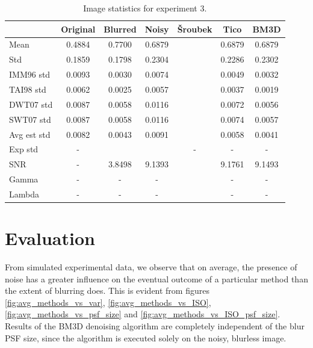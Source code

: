 \documentclass[12pt,notitlepage]{report}
\begin{document}
\begin{table}[htb]
	\centering
	\begin{tabular}{ | l | c | c | c | c | c | c | }
	\hline
		& Original & Blurred & Noisy & Šroubek & Tico & BM3D \\ \hline 
	Mean & 0.4884 & 0.7700 & 0.6879 &  & 0.6879 & 0.6879 \\ \hline 
	Std & 0.1859 & 0.1798 & 0.2304 &  & 0.2286 & 0.2302 \\ \hline 
	IMM96 std & 0.0093 & 0.0030 & 0.0074 &  & 0.0049 & 0.0032 \\ \hline 
	TAI98 std  & 0.0062 & 0.0025 & 0.0057 &  & 0.0037 & 0.0019 \\ \hline 
	DWT07 std  & 0.0087 & 0.0058 & 0.0116 &  & 0.0072 & 0.0056 \\ \hline 
	SWT07 std & 0.0087 & 0.0058 & 0.0116 &  & 0.0074 & 0.0057 \\ \hline 
	Avg est std & 0.0082 & 0.0043 & 0.0091 &  & 0.0058 & 0.0041 \\ \hline 
	Exp std & - &  &  & - & - & - \\ \hline 
	SNR     & - & 3.8498 & 9.1393 &  & 9.1761 & 9.1493 \\ \hline 
	Gamma & - & - & - &  & - & - \\ \hline 
	Lambda & - & - & - &  & - & - \\ \hline 

	\end{tabular}
	\caption{Image statistics for experiment 3.}
	\label{tab:experiment_003_statistics}
\end{table}

\section{Evaluation}
\label{sec:evaluation}

From simulated experimental data, we observe that on average, the presence of noise has a greater influence on the eventual outcome of a particular method than the extent of blurring does. This is evident from figures \ref{fig:avg_methods_vs_var}, \ref{fig:avg_methods_vs_ISO}, \ref{fig:avg_methods_vs_psf_size} and \ref{fig:avg_methods_vs_ISO_psf_size}. Results of the BM3D denoising algorithm are completely independent of the blur PSF size, since the algorithm is executed solely on the noisy, blurless image. 
\end{document}
